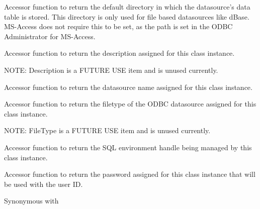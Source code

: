 \label{wxdbconnectinfgetdefaultdir}


Accessor function to return the default directory in which the datasource's data
table is stored.  This directory is only used for file based datasources like
dBase.  MS-Access does not require this to be set, as the path is set in the
ODBC Administrator for MS-Access.

\label{wxdbconnectinfgetdescription}


Accessor function to return the description assigned for this class
instance.

NOTE: Description is a FUTURE USE item and is unused currently.

\label{wxdbconnectinfgetdsn}


Accessor function to return the datasource name assigned for this class
instance.

\label{wxdbconnectinfgetfiletype}


Accessor function to return the filetype of the ODBC datasource assigned for
this class instance.

NOTE: FileType is a FUTURE USE item and is unused currently.

\label{wxdbconnectinfgethenv}


Accessor function to return the SQL environment handle being managed
by this class instance.

\label{wxdbconnectinfgetpassword}


Accessor function to return the password assigned for this class
instance that will be used with the user ID.

Synonymous with 

\label{wxdbconnectinfgetuid}

